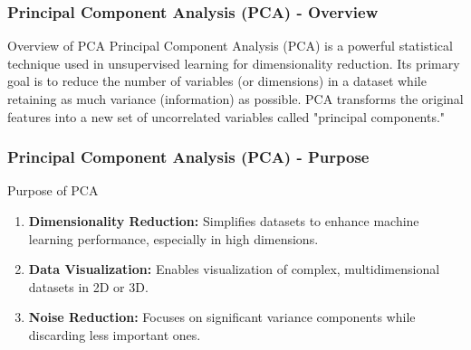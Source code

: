 \documentclass[aspectratio=169]{beamer}
\begin{document}
\begin{frame}[fragile]
    \frametitle{Principal Component Analysis (PCA) - Overview}
    \begin{block}{Overview of PCA}
        Principal Component Analysis (PCA) is a powerful statistical technique used in unsupervised learning for dimensionality reduction. Its primary goal is to reduce the number of variables (or dimensions) in a dataset while retaining as much variance (information) as possible. PCA transforms the original features into a new set of uncorrelated variables called "principal components."
    \end{block}
\end{frame}

\begin{frame}[fragile]
    \frametitle{Principal Component Analysis (PCA) - Purpose}
    \begin{block}{Purpose of PCA}
        \begin{enumerate}
            \item \textbf{Dimensionality Reduction:} Simplifies datasets to enhance machine learning performance, especially in high dimensions.
            \item \textbf{Data Visualization:} Enables visualization of complex, multidimensional datasets in 2D or 3D.
            \item \textbf{Noise Reduction:} Focuses on significant variance components while discarding less important ones.
        \end{enumerate}
    \end{block}
\end{frame}
\end{document}
